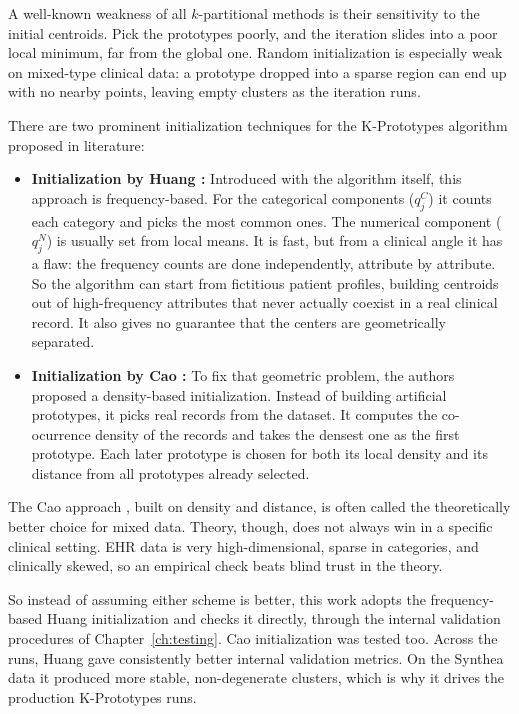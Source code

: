 A well-known weakness of all $k$-partitional methods is their sensitivity to the initial centroids. Pick the prototypes poorly, and the iteration slides into a poor local minimum, far from the global one. Random initialization is especially weak on mixed-type clinical data: a prototype dropped into a sparse region can end up with no nearby points, leaving empty clusters as the iteration runs.

\vspace{1em}

There are two prominent initialization techniques for the K-Prototypes algorithm proposed in literature:

\begin{itemize}
    \item \textbf{Initialization by Huang \cite{huang1998}:} Introduced with the algorithm itself, this approach is frequency-based. For the categorical components ($q_j^C$) it counts each category and picks the most common ones. The numerical component ($q_j^N$) is usually set from local means. It is fast, but from a clinical angle it has a flaw: the frequency counts are done independently, attribute by attribute. So the algorithm can start from fictitious patient profiles, building centroids out of high-frequency attributes that never actually coexist in a real clinical record. It also gives no guarantee that the centers are geometrically separated.

    \item \textbf{Initialization by Cao \cite{cao2009}:} To fix that geometric problem, the authors proposed a density-based initialization. Instead of building artificial prototypes, it picks real records from the dataset. It computes the co-ocurrence density of the records and takes the densest one as the first prototype. Each later prototype is chosen for both its local density and its distance from all prototypes already selected.
\end{itemize}

\vspace{1em}

The Cao approach \cite{cao2009}, built on density and distance, is often called the theoretically better choice for mixed data. Theory, though, does not always win in a specific clinical setting. EHR data is very high-dimensional, sparse in categories, and clinically skewed, so an empirical check beats blind trust in the theory.

So instead of assuming either scheme is better, this work adopts the frequency-based Huang initialization and checks it directly, through the internal validation procedures of Chapter~\ref{ch:testing}. Cao initialization was tested too. Across the runs, Huang gave consistently better internal validation metrics. On the Synthea data it produced more stable, non-degenerate clusters, which is why it drives the production K-Prototypes runs.

